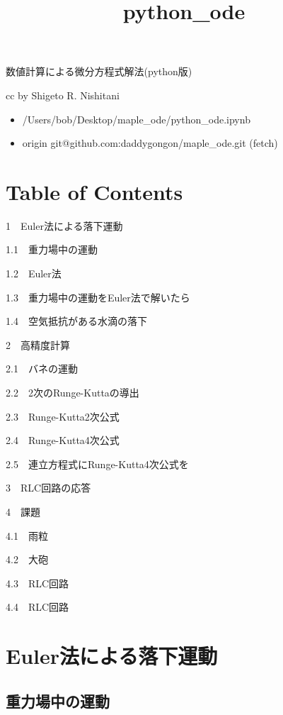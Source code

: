 \documentclass[11pt]{article}
\title{python\_ode}
\providecommand{\tightlist}{%
      \setlength{\itemsep}{0pt}\setlength{\parskip}{0pt}}
\begin{document}
    
    
    \maketitle
    
    

    
    数値計算による微分方程式解法(python版)

cc by Shigeto R. Nishitani

\begin{itemize}
\tightlist
\item
  /Users/bob/Desktop/maple\_ode/python\_ode.ipynb
\item
  origin git@github.com:daddygongon/maple\_ode.git (fetch)
\end{itemize}

    \section{Table of Contents}\label{table-of-contents}

{1~~}Euler法による落下運動

{1.1~~}重力場中の運動

{1.2~~}Euler法

{1.3~~}重力場中の運動をEuler法で解いたら

{1.4~~}空気抵抗がある水滴の落下

{2~~}高精度計算

{2.1~~}バネの運動

{2.2~~}2次のRunge-Kuttaの導出

{2.3~~}Runge-Kutta2次公式

{2.4~~}Runge-Kutta4次公式

{2.5~~}連立方程式にRunge-Kutta4次公式を

{3~~}RLC回路の応答

{4~~}課題

{4.1~~}雨粒

{4.2~~}大砲

{4.3~~}RLC回路

{4.4~~}RLC回路

    \section{Euler法による落下運動}\label{eulerux6cd5ux306bux3088ux308bux843dux4e0bux904bux52d5}

\subsection{重力場中の運動}\label{ux91cdux529bux5834ux4e2dux306eux904bux52d5}
\end{document}

